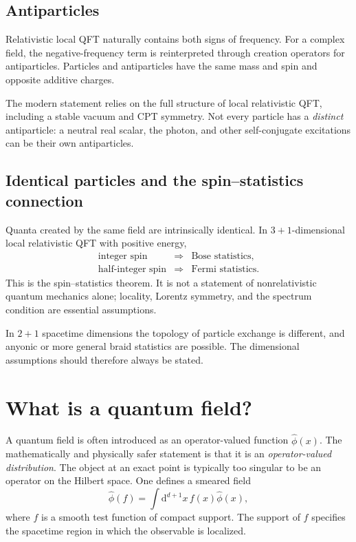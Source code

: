 \documentclass[11pt]{article}
\newcommand{\dd}{\mathrm{d}}
\begin{document}
\subsection{Antiparticles}

Relativistic local QFT naturally contains both signs of frequency.  For a
complex field, the negative-frequency term is reinterpreted through
creation operators for antiparticles.  Particles and antiparticles have the
same mass and spin and opposite additive charges.

The modern statement relies on the full structure of local relativistic QFT,
including a stable vacuum and CPT symmetry.  Not every particle has a
\emph{distinct} antiparticle: a neutral real scalar, the photon, and other
self-conjugate excitations can be their own antiparticles.

\subsection{Identical particles and the spin--statistics connection}

Quanta created by the same field are intrinsically identical.  In
$3+1$-dimensional local relativistic QFT with positive energy,
\begin{equation}
  \begin{array}{ccl}
  \text{integer spin} &\Longrightarrow& \text{Bose statistics},\\
  \text{half-integer spin} &\Longrightarrow& \text{Fermi statistics}.
  \end{array}
  \label{eq:spinstat}
\end{equation}
This is the spin--statistics theorem.  It is not a statement of
nonrelativistic quantum mechanics alone; locality, Lorentz symmetry, and
the spectrum condition are essential assumptions.

In $2+1$ spacetime dimensions the topology of particle exchange is
different, and anyonic or more general braid statistics are possible.  The
dimensional assumptions should therefore always be stated.

\section{What is a quantum field?}

A quantum field is often introduced as an operator-valued function
$\hat\phi(x)$.  The mathematically and physically safer statement is that it
is an \emph{operator-valued distribution}.  The object at an exact point is
typically too singular to be an operator on the Hilbert space.  One defines
a smeared field
\begin{equation}
  \hat\phi(f)
  =\int\dd^{d+1}x\,f(x)\hat\phi(x),
  \label{eq:smearedfield}
\end{equation}
where $f$ is a smooth test function of compact support.  The support of $f$
specifies the spacetime region in which the observable is localized.
\end{document}
